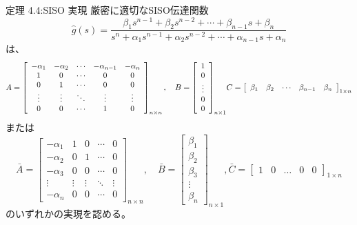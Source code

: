 \documentclass{jsarticle}
\begin{document}
\begin{itembox}[l]{定理 4.4:SISO 実現}
  厳密に適切なSISO伝達関数
  \begin{equation}
    \hat{g}(s)=\frac{\beta_{1} s^{n-1}+\beta_{2} s^{n-2}+\cdots+\beta_{n-1} s+\beta_{n}}{s^{n}+\alpha_{1} s^{n-1}+\alpha_{2} s^{n-2}+\cdots+\alpha_{n-1} s+\alpha_{n}}
  \end{equation}
  は、
  \begin{equation}
    A=\left[\begin{array}{ccccc}
      -\alpha_{1} & -\alpha_{2} & \cdots & -\alpha_{n-1} & -\alpha_{n} \\
      1 & 0 & \cdots & 0 & 0 \\
      0 & 1 & \cdots & 0 & 0 \\
      \vdots & \vdots & \ddots & \vdots & \vdots \\
      0 & 0 & \cdots & 1 & 0
      \end{array}\right]_{n \times n}, \quad B=\left[\begin{array}{c}
      1 \\
      0 \\
      \vdots \\
      0 \\
      0
      \end{array}\right]_{n \times 1}
      $$
      $$
      C=\left[\begin{array}{lllll}
      \beta_{1} & \beta_{2} & \cdots & \beta_{n-1} & \beta_{n}
      \end{array}\right]_{1 \times n}
  \end{equation}
  または
  \begin{equation}
    \bar{A}=\left[\begin{array}{ccccc}
      -\alpha_{1} & 1 & 0 & \cdots & 0 \\
      -\alpha_{2} & 0 & 1 & \cdots & 0 \\
      -\alpha_{3} & 0 & 0 & \cdots & 0 \\
      \vdots & \vdots & \vdots & \ddots & \vdots \\
      -\alpha_{n} & 0 & 0 & \cdots & 0
      \end{array}\right]_{n \times n}, \quad \bar{B}=\left[\begin{array}{c}
      \beta_{1} \\
      \beta_{2} \\
      \beta_{3} \\
      \vdots \\
      \beta_{n}
      \end{array}\right]_{n \times 1}, \bar{C}=\left[\begin{array}{lllll}
      1 & 0 & \ldots & 0 & 0
      \end{array}\right]_{1 \times n}
  \end{equation}
  のいずれかの実現を認める。
\end{itembox}
\end{document}
